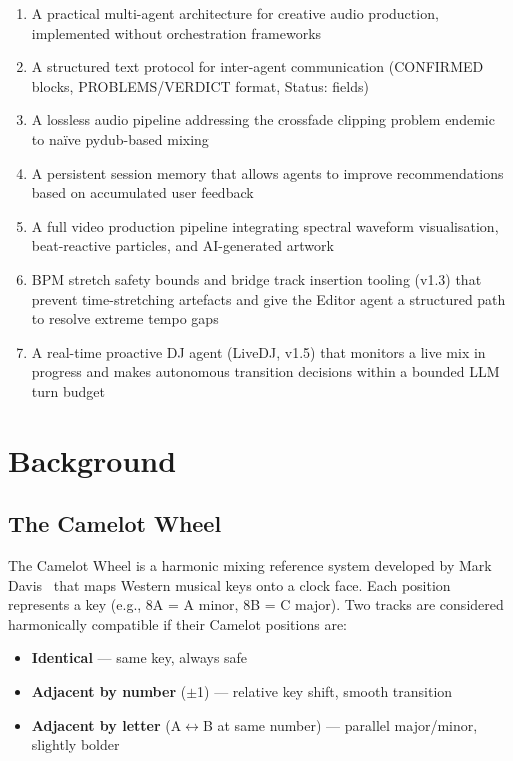 \documentclass[11pt,a4paper]{article}
\begin{document}
\begin{enumerate}[leftmargin=*, label=\arabic*.]
  \item A practical multi-agent architecture for creative audio production,
        implemented without orchestration frameworks
  \item A structured text protocol for inter-agent communication (CONFIRMED
        blocks, PROBLEMS/VERDICT format, Status: fields)
  \item A lossless audio pipeline addressing the crossfade clipping problem
        endemic to na\"ive pydub-based mixing
  \item A persistent session memory that allows agents to improve
        recommendations based on accumulated user feedback
  \item A full video production pipeline integrating spectral waveform
        visualisation, beat-reactive particles, and AI-generated artwork
  \item BPM stretch safety bounds and bridge track insertion tooling (v1.3)
        that prevent time-stretching artefacts and give the Editor agent a
        structured path to resolve extreme tempo gaps
  \item A real-time proactive DJ agent (LiveDJ, v1.5) that monitors a live
        mix in progress and makes autonomous transition decisions within a
        bounded LLM turn budget
\end{enumerate}

\section{Background}

\subsection{The Camelot Wheel}

The Camelot Wheel is a harmonic mixing reference system developed by Mark
Davis~\cite{davis2004} that maps Western musical keys onto a clock face. Each
position represents a key (e.g., 8A = A minor, 8B = C major). Two tracks are
considered harmonically compatible if their Camelot positions are:

\begin{itemize}
  \item \textbf{Identical} --- same key, always safe
  \item \textbf{Adjacent by number} ($\pm$1) --- relative key shift, smooth transition
  \item \textbf{Adjacent by letter} (A$\leftrightarrow$B at same number) ---
        parallel major/minor, slightly bolder
\end{itemize}
\end{document}
